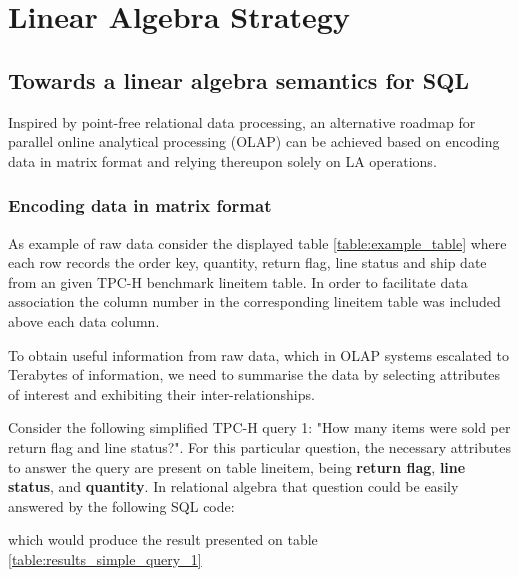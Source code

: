 \section{Linear Algebra Strategy}
\label{strategy}
\indent
\subsection{Towards a linear algebra semantics for SQL}

Inspired by point-free relational data processing, an alternative roadmap for parallel online analytical processing (OLAP) can be achieved based on encoding data in matrix format and relying thereupon solely on LA operations\cite{macedo2011middle}. 

\subsubsection{Encoding data in matrix format}

As example of raw data consider the displayed table \ref{table:example_table} where each row records the order key, quantity, return flag, line status and ship date from an given TPC-H benchmark lineitem table. In order to facilitate data association the column number in the corresponding lineitem table was included above each data column.


To obtain useful information from raw data, which in OLAP systems escalated to Terabytes of information, we need to summarise the data by selecting attributes of interest and exhibiting their inter-relationships.\par 
Consider the following simplified TPC-H query 1: "How many items were sold per return flag and line status?". For this particular question, the necessary attributes to answer the query are present on table lineitem, being \textbf{return flag}, \textbf{line status}, and \textbf{quantity}. In relational algebra that question could be easily answered by the following SQL code:



which would produce the result presented on table \ref{table:results_simple_query_1}


